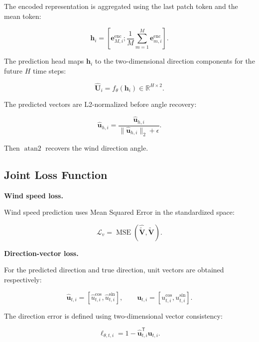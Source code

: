 The encoded representation is aggregated using the last patch token and the mean token:

\begin{equation}
\mathbf{h}_i = \left[ \mathbf{e}_{M,i}^{\mathrm{enc}}; \frac{1}{M} \sum_{m=1}^{M} \mathbf{e}_{m,i}^{\mathrm{enc}} \right].
\end{equation}

The prediction head maps $\mathbf{h}_i$ to the two-dimensional direction components for the future $H$ time steps:

\begin{equation}
\hat{\mathbf{U}}_i = f_{\theta}(\mathbf{h}_i) \in \mathbb{R}^{H\times 2}.
\end{equation}

The predicted vectors are L2-normalized before angle recovery:

\begin{equation}
\hat{\mathbf{u}}_{h,i} = \frac{\hat{\mathbf{u}}_{h,i}}{\|\hat{\mathbf{u}}_{h,i}\|_2+\epsilon}.
\end{equation}

Then $\operatorname{atan2}$ recovers the wind direction angle.

\subsection{Joint Loss Function}

\textbf{Wind speed loss.}

Wind speed prediction uses Mean Squared Error in the standardized space:

\begin{equation}
\mathcal{L}_{v} = \operatorname{MSE} \left( \hat{\tilde{\mathbf{V}}}, \tilde{\mathbf{V}} \right).
\end{equation}

\textbf{Direction-vector loss.}

For the predicted direction and true direction, unit vectors are obtained respectively:

\begin{equation}
\hat{\mathbf{u}}_{t,i} = [\hat{u}^{\cos}_{t,i}, \hat{u}^{\sin}_{t,i}], \qquad \mathbf{u}_{t,i} = [u^{\cos}_{t,i}, u^{\sin}_{t,i}].
\end{equation}

The direction error is defined using two-dimensional vector consistency:

\begin{equation}
\ell_{\theta,t,i} = 1 - \hat{\mathbf{u}}_{t,i}^{\mathsf{T}} \mathbf{u}_{t,i}.
\end{equation}

